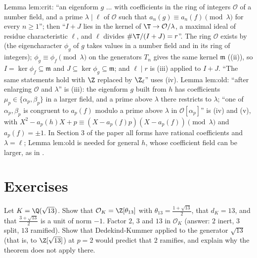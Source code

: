\begin{paperlink}\label{pl:ant:crit}
Lemma lem:crit: ``an eigenform $g$ ... with coefficients in the ring of integers $\mathcal O$ of a number field, and a prime $\lambda\mid\ell$ of $\mathcal O$ such that
$a_n(g)\equiv a_n(f)\pmod\lambda$ for every $n\ge1$''; then ``$I+J$ lies in the kernel of $\T\to\mathcal O/\lambda$, a maximal ideal of residue characteristic $\ell$, and
$\ell$ divides $\#\T/(I+J)=r$''. The ring $\mathcal O$ exists by  (the eigencharacter $\phi_g$ of $g$ takes values in a number field and in its
ring of integers); $\phi_g\equiv\phi_f\pmod\lambda$ on the generators $T_n$ gives the same kernel $\mathfrak m$ ((ii)), so
$I=\ker\phi_f\subseteq\mathfrak m$ and $J\subseteq\ker\phi_g\subseteq\mathfrak m$; and $\ell\mid r$ is (iii) applied to $I+J$. ``The same
statements hold with $\Z$ replaced by $\Z_\ell$'' uses (iv). Lemma lem:old: ``after enlarging $\mathcal O$ and $\lambda$'' is
(iii): the eigenform $g$ built from $h$ has coefficients $\mu_p\in\{\alpha_p,\beta_p\}$ in a larger field, and a prime above $\lambda$ there
restricts to $\lambda$; ``one of $\alpha_p,\beta_p$ is congruent to $a_p(f)$ modulo a prime above $\lambda$ in $\mathcal O[\alpha_p]$'' is
(iv) and (v), with $X^2-a_p(h)X+p\equiv(X-a_p(f)p)(X-a_p(f))\pmod\lambda$ and $a_p(f)=\pm1$. In Section 3 of the paper all forms have
rational coefficients and $\lambda=\ell$; Lemma lem:old is needed for general $h$, whose coefficient field can be larger, as in .
\end{paperlink}

\section{Exercises}\label{sec:ant:exercises}

\begin{exercise}\label{ex:ant:ex-sqrt13}
Let $K=\Q(\sqrt{13})$. Show that $\mathcal O_K=\Z[\theta_{13}]$ with $\theta_{13}=\frac{1+\sqrt{13}}2$, that $d_K=13$, and that $\frac{3+\sqrt{13}}2$ is a unit of norm $-1$. Factor
$2$, $3$ and $13$ in $\mathcal O_K$ (answer: $2$ inert, $3$ split, $13$ ramified). Show that Dedekind-Kummer applied to the generator $\sqrt{13}$ (that is, to $\Z[\sqrt{13}]$) at $p=2$ would predict
that $2$ ramifies, and explain why the theorem does not apply there.
\end{exercise}

